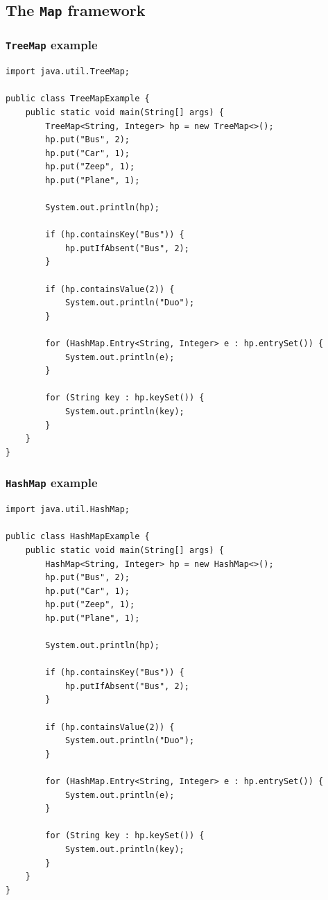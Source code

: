 \documentclass{book}
\begin{document}
\subsection{The \texttt{Map} framework}

\subsubsection{\texttt{TreeMap} example}

\begin{verbatim}
import java.util.TreeMap;

public class TreeMapExample {
    public static void main(String[] args) {
        TreeMap<String, Integer> hp = new TreeMap<>();
        hp.put("Bus", 2);
        hp.put("Car", 1);
        hp.put("Zeep", 1);
        hp.put("Plane", 1);

        System.out.println(hp);

        if (hp.containsKey("Bus")) {
            hp.putIfAbsent("Bus", 2);
        }

        if (hp.containsValue(2)) {
            System.out.println("Duo");
        }

        for (HashMap.Entry<String, Integer> e : hp.entrySet()) {
            System.out.println(e);
        }

        for (String key : hp.keySet()) {
            System.out.println(key);
        }
    }
}
\end{verbatim}

\subsubsection{\texttt{HashMap} example}

\begin{verbatim}
import java.util.HashMap;

public class HashMapExample {
    public static void main(String[] args) {
        HashMap<String, Integer> hp = new HashMap<>();
        hp.put("Bus", 2);
        hp.put("Car", 1);
        hp.put("Zeep", 1);
        hp.put("Plane", 1);

        System.out.println(hp);

        if (hp.containsKey("Bus")) {
            hp.putIfAbsent("Bus", 2);
        }

        if (hp.containsValue(2)) {
            System.out.println("Duo");
        }

        for (HashMap.Entry<String, Integer> e : hp.entrySet()) {
            System.out.println(e);
        }

        for (String key : hp.keySet()) {
            System.out.println(key);
        }
    }
}
\end{verbatim}
\end{document}
